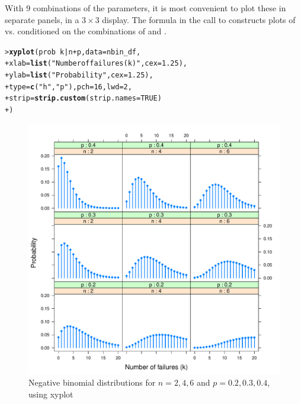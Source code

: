 \documentclass[10pt,krantz2]{krantz}\usepackage[]{graphicx}\usepackage[]{color}
\makeatletter
\newcommand{\hlnum}[1]{\textcolor[rgb]{0.686,0.059,0.569}{#1}}%
\newcommand{\hlstr}[1]{\textcolor[rgb]{0.192,0.494,0.8}{#1}}%
\newcommand{\hlopt}[1]{\textcolor[rgb]{0,0,0}{#1}}%
\newcommand{\hlstd}[1]{\textcolor[rgb]{0.345,0.345,0.345}{#1}}%
\newcommand{\hlkwc}[1]{\textcolor[rgb]{0.333,0.667,0.333}{#1}}%
\newcommand{\hlkwd}[1]{\textcolor[rgb]{0.737,0.353,0.396}{\textbf{#1}}}%
\newenvironment{kframe}{%
 \def\at@end@of@kframe{}%
 \ifinner\ifhmode%
  \def\at@end@of@kframe{\end{minipage}}%
  \begin{minipage}{\columnwidth}%
 \fi\fi%
 \def\FrameCommand##1{\hskip\@totalleftmargin \hskip-\fboxsep
 \colorbox{shadecolor}{##1}\hskip-\fboxsep
     \hskip-\linewidth \hskip-\@totalleftmargin \hskip\columnwidth}%
 \MakeFramed {\advance\hsize-\width
   \@totalleftmargin\z@ \linewidth\hsize
   \@setminipage}}%
 {\par\unskip\endMakeFramed%
 \at@end@of@kframe}
\newenvironment{knitrout}{}{} %
\renewenvironment{knitrout}{\small\renewcommand{\baselinestretch}{.85}}{} %
\makeatother
\begin{document}
With 9 combinations of the parameters, it is most convenient
to plot these in separate panels, in a $3 \times 3$ display.
The formula  in the call to
 constructs plots of
 vs.  conditioned on the combinations of
 and .
\begin{knitrout}
\color{fgcolor}\begin{kframe}
\begin{alltt}
\hlstd{> }\hlkwd{xyplot}\hlstd{(prob} \hlopt{~} \hlstd{k} \hlopt{|} \hlstd{n} \hlopt{+} \hlstd{p,} \hlkwc{data} \hlstd{= nbin_df,}
\hlstd{+ }  \hlkwc{xlab} \hlstd{=} \hlkwd{list}\hlstd{(}\hlstr{"Number of failures (k)"}\hlstd{,} \hlkwc{cex} \hlstd{=} \hlnum{1.25}\hlstd{),}
\hlstd{+ }  \hlkwc{ylab} \hlstd{=} \hlkwd{list}\hlstd{(}\hlstr{"Probability"}\hlstd{,}  \hlkwc{cex} \hlstd{=} \hlnum{1.25}\hlstd{),}
\hlstd{+ }  \hlkwc{type} \hlstd{=} \hlkwd{c}\hlstd{(}\hlstr{"h"}\hlstd{,} \hlstr{"p"}\hlstd{),} \hlkwc{pch} \hlstd{=} \hlnum{16}\hlstd{,} \hlkwc{lwd} \hlstd{=} \hlnum{2}\hlstd{,}
\hlstd{+ }  \hlkwc{strip} \hlstd{=} \hlkwd{strip.custom}\hlstd{(}\hlkwc{strip.names} \hlstd{=} \hlnum{TRUE}\hlstd{)}
\hlstd{+ }        \hlstd{)}
\end{alltt}
\end{kframe}\begin{figure}[!htbp]

\centerline{\includegraphics[width=.85\textwidth]{ch03/fig/dnbin3-1} }

\caption[Negative binomial distributions for ]{Negative binomial distributions for $n = 2, 4, 6$ and $p=0.2, 0.3, 0.4$, using xyplot\label{fig:dnbin3}}
\end{figure}


\end{knitrout}
\end{document}
